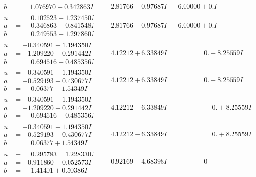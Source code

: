 \documentclass[1p]{elsarticle_modified}
\theoremstyle{definition}
\begin{document}
$$\begin{array}{c|c|c}
\begin{aligned}
b &= \phantom{-}1.076970 - 0.342863 I\end{aligned}
 & \phantom{-}2.81766 - 0.97687 I & -6.00000 + 0. I\phantom{ +0.000000I} \\ \hline\begin{aligned}
u &= \phantom{-}0.102623 - 1.237450 I \\
a &= \phantom{-}0.346863 + 0.841548 I \\
b &= \phantom{-}0.249553 + 1.297860 I\end{aligned}
 & \phantom{-}2.81766 - 0.97687 I & -6.00000 + 0. I\phantom{ +0.000000I} \\ \hline\begin{aligned}
u &= -0.340591 + 1.194350 I \\
a &= -1.209220 + 0.291442 I \\
b &= \phantom{-}0.694616 - 0.485356 I\end{aligned}
 & \phantom{-}4.12212 + 6.33849 I & \phantom{-0.000000 } 0. - 8.25559 I \\ \hline\begin{aligned}
u &= -0.340591 + 1.194350 I \\
a &= -0.529193 - 0.430677 I \\
b &= \phantom{-}0.06377 - 1.54349 I\end{aligned}
 & \phantom{-}4.12212 + 6.33849 I & \phantom{-0.000000 } 0. - 8.25559 I \\ \hline\begin{aligned}
u &= -0.340591 - 1.194350 I \\
a &= -1.209220 - 0.291442 I \\
b &= \phantom{-}0.694616 + 0.485356 I\end{aligned}
 & \phantom{-}4.12212 - 6.33849 I & \phantom{-0.000000 -}0. + 8.25559 I \\ \hline\begin{aligned}
u &= -0.340591 - 1.194350 I \\
a &= -0.529193 + 0.430677 I \\
b &= \phantom{-}0.06377 + 1.54349 I\end{aligned}
 & \phantom{-}4.12212 - 6.33849 I & \phantom{-0.000000 -}0. + 8.25559 I \\ \hline\begin{aligned}
u &= \phantom{-}0.295783 + 1.228330 I \\
a &= -0.911860 - 0.052573 I \\
b &= \phantom{-}1.41401 + 0.50386 I\end{aligned}
 & \phantom{-}0.92169 - 4.68398 I & \phantom{-0.000000 } 0 \\ \hline\begin{aligned}

\end{aligned}
\end{array}$$
\end{document}
